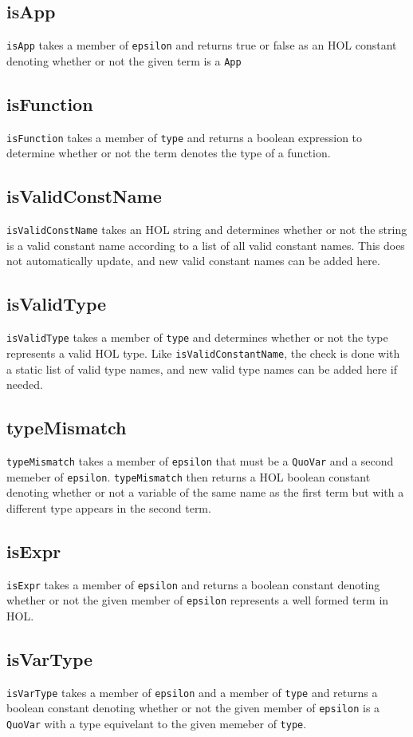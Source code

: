 \documentclass{article}
\def\c#1{\texttt{#1}}
\begin{document}
\subsection{isApp}
\c{isApp} takes a member of \c{epsilon} and returns true or false as an HOL constant denoting whether or not the given term is a \c{App}

\subsection{isFunction}
\c{isFunction} takes a member of \c{type} and returns a boolean expression to determine whether or not the term denotes the type of a function.

\subsection{isValidConstName}
\c{isValidConstName} takes an HOL string and determines whether or not the string is a valid constant name according to a list of all valid constant names. This does not automatically update, and new valid constant names can be added here.

\subsection{isValidType}
\c{isValidType} takes a member of \c{type} and determines whether or not the type represents a valid HOL type. Like \c{isValidConstantName}, the check is done with a static list of valid type names, and new valid type names can be added here if needed.

\subsection{typeMismatch}
\c{typeMismatch} takes a member of \c{epsilon} that must be a \c{QuoVar} and a second memeber of \c{epsilon}. \c{typeMismatch} then returns a HOL boolean constant denoting whether or not a variable of the same name as the first term but with a different type appears in the second term.

\subsection{isExpr}
\c{isExpr} takes a member of \c{epsilon} and returns a boolean constant denoting whether or not the given member of \c{epsilon} represents a well formed term in HOL. 

\subsection{isVarType}
\c{isVarType} takes a member of \c{epsilon} and a member of \c{type} and returns a boolean constant denoting whether or not the given member of \c{epsilon} is a \c{QuoVar} with a type equivelant to the given memeber of \c{type}.
\end{document}
